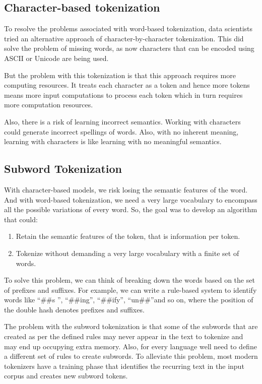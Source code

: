 \subsection{Character-based tokenization}
To resolve the problems associated with word-based tokenization, data scientists tried an alternative approach of character-by-character tokenization. This did solve the problem of missing words, as now characters that can be encoded using ASCII or Unicode are being used. 

But the problem with this tokenization is that this approach requires more computing resources. It treats each character as a token and hence more tokens means more input computations to process each token which in turn requires more computation resources.

Also, there is a risk of learning incorrect semantics. Working with characters could generate incorrect spellings of words. Also, with no inherent meaning, learning with characters is like learning with no meaningful semantics.

\subsection{Subword Tokenization}
With character-based models, we risk losing the semantic features of the word. And with word-based tokenization, we  need a very large vocabulary to encompass all the possible variations of every word. So, the goal was to develop an algorithm that could:

\begin{enumerate}
    \item Retain the semantic features of the token, that is information per token.
    \item Tokenize without demanding a very large vocabulary with a finite set of words.
\end{enumerate}

To solve this problem, we can think of breaking down the words based on the set of prefixes and suffixes. For example, we can write a rule-based system to identify words like \textquotedblleft \#\#s \textquotedblright, \textquotedblleft \#\#ing\textquotedblright , \textquotedblleft \#\#ify\textquotedblright , \textquotedblleft un\#\#\textquotedblright and so on, where the position of the double hash denotes prefixes and suffixes.

The problem with the subword tokenization is that some of the subwords that are created as per the defined rules may never appear in the text to tokenize and may end up occupying extra memory. Also, for every language we\textquotesingle ll need to define a different set of rules to create subwords. To alleviate this problem, most modern tokenizers have a training phase that identifies the recurring text in the input corpus and creates new subword tokens.

